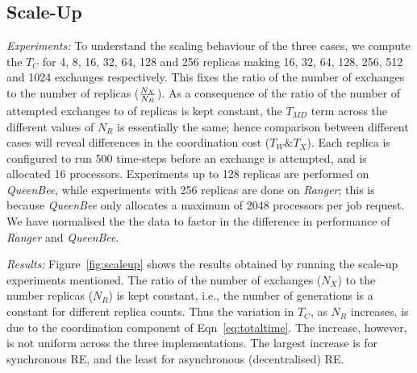 \documentclass{rspublic}
\newcommand{\alnote}[1]{ {\textcolor{blue} { ***andre: #1 }}}
\newcommand{\alnote}[1]{}
\begin{document}
\subsection{Scale-Up}


{\it Experiments: } To understand the scaling behaviour of the three
cases, we compute the $T_C$ for 4, 8, 16, 32, 64, 128 and 256 replicas
making 16, 32, 64, 128, 256, 512 and 1024 exchanges respectively. This
fixes the ratio of the number of exchanges to the number of replicas
($N_X \over N_R$).  As a consequence of the ratio of the number of
attempted exchanges to of replicas is kept constant, the $T_{MD}$ term
across the different values of $N_R$ is essentially the same; hence
comparison between different cases will reveal differences in the
coordination cost ($T_W \& T_X$).  Each replica is configured to run
500 time-steps before an exchange is attempted, and is allocated 16
processors. Experiments up to 128 replicas are performed on {\it
  QueenBee}, while experiments with 256 replicas are done on
\emph{Ranger}; this is because \emph{QueenBee} only allocates a
maximum of 2048 processors per job request. We have normalised the the
data to factor in the difference in performance of {\it Ranger} and
{\it QueenBee}.



{\it Results:} Figure~\ref{fig:scaleup} shows the results obtained by
running the scale-up experiments mentioned.  The ratio of the number
of exchanges ($N_X$) to the number replicas ($N_R$) is kept constant,
i.e., the number of generations is a constant for different replica
counts.  Thus the variation in $T_C$, as $N_R$ increases, is due to
the coordination component of Eqn~\ref{eq:totaltime}.  The increase,
however, is not uniform across the three implementations.  The largest
increase is for synchronous RE, and the least for asynchronous
(decentralised) RE.




\end{document}
